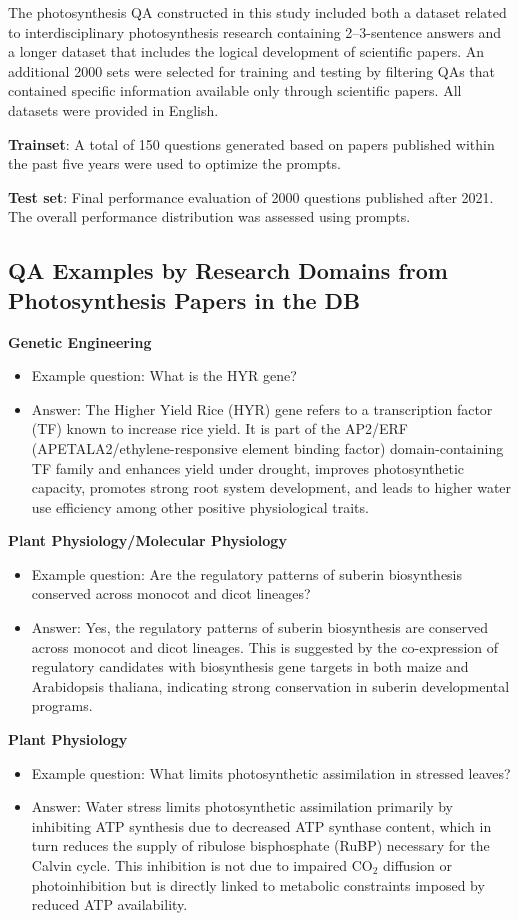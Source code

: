 \documentclass[12pt]{article}
\begin{document}
The photosynthesis QA constructed in this study included both a dataset related to interdisciplinary photosynthesis research containing 2--3-sentence answers and a longer dataset that includes the logical development of scientific papers. An additional 2000 sets were selected for training and testing by filtering QAs that contained specific information available only through scientific papers. All datasets were provided in English.

\textbf{Trainset}: A total of 150 questions generated based on papers published within the past five years were used to optimize the prompts.

\textbf{Test set}: Final performance evaluation of 2000 questions published after 2021. The overall performance distribution was assessed using prompts.

\subsection{QA Examples by Research Domains from Photosynthesis Papers in the DB}
\textbf{Genetic Engineering} \cite{ref31}
\begin{itemize}
    \item Example question: What is the HYR gene?
    \item Answer: The Higher Yield Rice (HYR) gene refers to a transcription factor (TF) known to increase rice yield. It is part of the AP2/ERF (APETALA2/ethylene-responsive element binding factor) domain-containing TF family and enhances yield under drought, improves photosynthetic capacity, promotes strong root system development, and leads to higher water use efficiency among other positive physiological traits.
\end{itemize}

\textbf{Plant Physiology/Molecular Physiology} \cite{ref32}
\begin{itemize}
    \item Example question: Are the regulatory patterns of suberin biosynthesis conserved across monocot and dicot lineages?
    \item Answer: Yes, the regulatory patterns of suberin biosynthesis are conserved across monocot and dicot lineages. This is suggested by the co-expression of regulatory candidates with biosynthesis gene targets in both maize and Arabidopsis thaliana, indicating strong conservation in suberin developmental programs.
\end{itemize}

\textbf{Plant Physiology} \cite{ref33}
\begin{itemize}
    \item Example question: What limits photosynthetic assimilation in stressed leaves?
    \item Answer: Water stress limits photosynthetic assimilation primarily by inhibiting ATP synthesis due to decreased ATP synthase content, which in turn reduces the supply of ribulose bisphosphate (RuBP) necessary for the Calvin cycle. This inhibition is not due to impaired CO$_2$ diffusion or photoinhibition but is directly linked to metabolic constraints imposed by reduced ATP availability.
\end{itemize}
\end{document}
